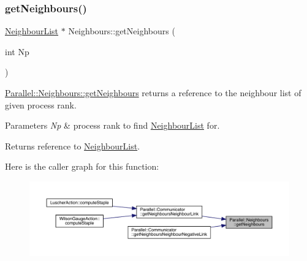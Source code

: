 \mbox{\label{class_parallel_1_1_neighbours_aa3e776b78a708f2c4ce9f287b81f263e}} 
\subsubsection{\texorpdfstring{getNeighbours()}{getNeighbours()}}
{\footnotesize\ttfamily \mbox{\hyperlink{struct_neighbour_list}{Neighbour\+List}} $\ast$ Neighbours\+::get\+Neighbours (\begin{DoxyParamCaption}\item[{int}]{Np }\end{DoxyParamCaption})\hspace{0.3cm}{\ttfamily [static]}}



\mbox{\hyperlink{class_parallel_1_1_neighbours_aa3e776b78a708f2c4ce9f287b81f263e}{Parallel\+::\+Neighbours\+::get\+Neighbours}} returns a reference to the neighbour list of given process rank. 


\begin{DoxyParams}{Parameters}
{\em Np} & process rank to find \mbox{\hyperlink{struct_neighbour_list}{Neighbour\+List}} for. \\
\hline
\end{DoxyParams}
\begin{DoxyReturn}{Returns}
reference to \mbox{\hyperlink{struct_neighbour_list}{Neighbour\+List}}. 
\end{DoxyReturn}
Here is the caller graph for this function\+:\nopagebreak
\begin{figure}[H]
\begin{center}
\leavevmode
\includegraphics[width=350pt]{class_parallel_1_1_neighbours_aa3e776b78a708f2c4ce9f287b81f263e_icgraph}
\end{center}
\end{figure}
\mbox{\label{class_parallel_1_1_neighbours_ad1a2a616b4089eded3545faf11409b85}} 
